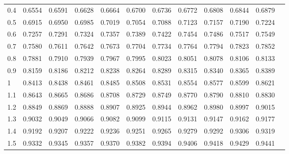 \begin{table}[!htbp]
\begin{tabularx}{\linewidth}{@{}BYZYZYZYZYZY@{}}
            0.4 & 0.6554     & 0.6591        & 0.6628        & 0.6664        & 0.6700        & 0.6736        & 0.6772        & 0.6808        & 0.6844        & 0.6879        \\
            0.5 & 0.6915     & 0.6950        & 0.6985        & 0.7019        & 0.7054        & 0.7088        & 0.7123        & 0.7157        & 0.7190        & 0.7224        \\
            0.6 & 0.7257     & 0.7291        & 0.7324        & 0.7357        & 0.7389        & 0.7422        & 0.7454        & 0.7486        & 0.7517        & 0.7549        \\
            0.7 & 0.7580     & 0.7611        & 0.7642        & 0.7673        & 0.7704        & 0.7734        & 0.7764        & 0.7794        & 0.7823        & 0.7852        \\
            0.8 & 0.7881     & 0.7910        & 0.7939        & 0.7967        & 0.7995        & 0.8023        & 0.8051        & 0.8078        & 0.8106        & 0.8133        \\
            0.9 & 0.8159     & 0.8186        & 0.8212        & 0.8238        & 0.8264        & 0.8289        & 0.8315        & 0.8340        & 0.8365        & 0.8389        \\
            1   & 0.8413     & 0.8438        & 0.8461        & 0.8485        & 0.8508        & 0.8531        & 0.8554        & 0.8577        & 0.8599        & 0.8621        \\
            1.1 & 0.8643     & 0.8665        & 0.8686        & 0.8708        & 0.8729        & 0.8749        & 0.8770        & 0.8790        & 0.8810        & 0.8830        \\
            1.2 & 0.8849     & 0.8869        & 0.8888        & 0.8907        & 0.8925        & 0.8944        & 0.8962        & 0.8980        & 0.8997        & 0.9015        \\
            1.3 & 0.9032     & 0.9049        & 0.9066        & 0.9082        & 0.9099        & 0.9115        & 0.9131        & 0.9147        & 0.9162        & 0.9177        \\
            1.4 & 0.9192     & 0.9207        & 0.9222        & 0.9236        & 0.9251        & 0.9265        & 0.9279        & 0.9292        & 0.9306        & 0.9319        \\
            1.5 & 0.9332     & 0.9345        & 0.9357        & 0.9370        & 0.9382        & 0.9394        & 0.9406        & 0.9418        & 0.9429        & 0.9441        \\

\end{tabularx}
\end{table}
